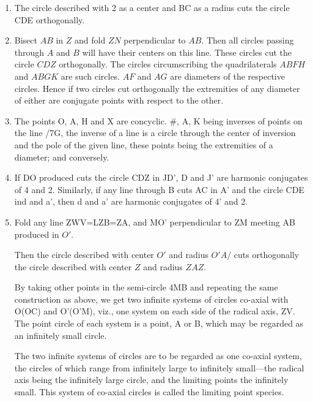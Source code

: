 \begin{enumerate}
\item The circle described with 2 as a center and BC as a radius cuts the circle
    CDE orthogonally.


\item Bisect $AB$ in $Z$ and fold $ZN$ perpendicular to $AB$. Then all circles
    passing through $A$ and $B$ will have their centers on this line.  These
    circles cut the circle $CDZ$ orthogonally.  The circles circumscribing the
    quadrilaterals $ABFH$ and $ABGK$ are such circles.  $AF$ and $AG$ are
    diameters of the respective circles.  Hence if two circles cut orthogonally
    the extremities of any diameter of either are conjugate points with respect
    to the other.


\item The points O, A, H and X are concyclic. #, A, K being inverses of points on
    the line /7G, the inverse of a line is a circle through the center of
    inversion and the pole of the given line, these points being the extremities
    of a diameter; and conversely.


\item If DO produced cuts the circle CDZ in JD’, D and J’ are harmonic
    conjugates of 4 and 2. Similarly, if any line through B cuts AC in A’ and
    the circle CDE ind and a’, then d and a’ are harmonic conjugates of 4’ and
    2.


\item Fold any line ZWV=LZB=ZA, and MO’ perpendicular to ZM meeting AB produced
    in $O'$.

    Then the circle described with center $O'$ and radius $O'A/$ cuts
    orthogonally the circle described with center $Z$ and radius $ZAZ$.

%

    By taking other points in the semi-circle 4MB and repeating the same
    construction as above, we get two infinite systems of circles co-axial with
    O(OC) and O'(O'M), viz., one system on each side of the radical axis, ZV.
    The point circle of each system is a point, A or B, which may be regarded
    as an infinitely small circle.

    The two infinite systems of circles are to be regarded as one co-axial
    system, the circles of which range from infinitely large to infinitely
    small—the radical axis being the infinitely large circle, and the limiting
    points the infinitely small. This system of co-axial circles is called the
    limiting point species.


\end{enumerate}
